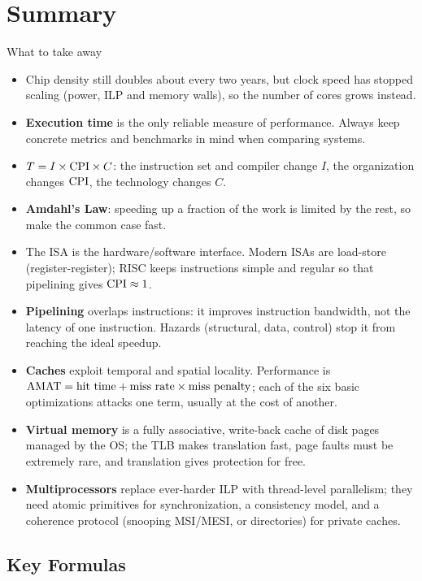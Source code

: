 \section{Summary}
\label{sec:summary}

\begin{noot}{What to take away}
\begin{itemize}[leftmargin=*]
  \item Chip density still doubles about every two years, but clock speed has
  stopped scaling (power, ILP and memory walls), so the number of cores grows
  instead.
  \item \textbf{Execution time} is the only reliable measure of performance.
  Always keep concrete metrics and benchmarks in mind when comparing systems.
  \item $T = I\times\mathrm{CPI}\times C$: the instruction set and compiler change $I$,
  the organization changes $\mathrm{CPI}$, the technology changes $C$.
  \item \textbf{Amdahl's Law}: speeding up a fraction of the work is limited by
  the rest, so make the common case fast.
  \item The ISA is the hardware/software interface. Modern ISAs are
  load-store (register-register); RISC keeps instructions simple and regular so
  that pipelining gives $\mathrm{CPI}\approx1$.
  \item \textbf{Pipelining} overlaps instructions: it improves instruction
  bandwidth, not the latency of one instruction. Hazards (structural, data,
  control) stop it from reaching the ideal speedup.
  \item \textbf{Caches} exploit temporal and spatial locality. Performance is
  $\mathrm{AMAT}=\text{hit time}+\text{miss rate}\times\text{miss penalty}$; each of the six
  basic optimizations attacks one term, usually at the cost of another.
  \item \textbf{Virtual memory} is a fully associative, write-back cache of disk
  pages managed by the OS; the TLB makes translation fast, page faults must be
  extremely rare, and translation gives protection for free.
  \item \textbf{Multiprocessors} replace ever-harder ILP with thread-level
  parallelism; they need atomic primitives for synchronization, a consistency model,
  and a coherence protocol (snooping MSI/MESI, or directories) for private caches.
\end{itemize}
\end{noot}

\subsection{Key Formulas}

